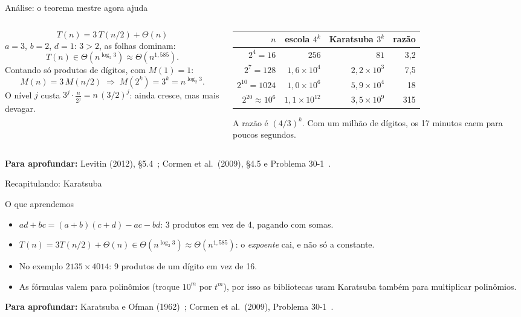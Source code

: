 \documentclass[aspectratio=169,xcolor=table]{beamer}
\newcommand{\fonte}[1]{%
  \vfill
  {\tiny\color{gray!55!black}\textbf{Para aprofundar:} #1\par}%
}
\begin{document}
\begin{frame}{Análise: o teorema mestre agora ajuda}
  \begin{columns}[T]
    \begin{column}{0.46\textwidth}
      \scriptsize
      \[ T(n) = 3\,T(n/2) + \Theta(n) \]
      $a=3$, $b=2$, $d=1$: $3 > 2$, as folhas dominam:
      \[ T(n)\in\Theta(n^{\log_2 3}) \approx \Theta(n^{1{,}585}). \]
      Contando só produtos de dígitos, com $M(1)=1$:
      \[ M(n) = 3\,M(n/2) \;\Rightarrow\; M(2^k)=3^k = n^{\log_2 3}. \]
      O nível $j$ custa $3^j\cdot\frac{n}{2^j}=n\,(3/2)^j$: ainda cresce, mas mais devagar.
    \end{column}
    \begin{column}{0.5\textwidth}
      \centering\scriptsize
      \begin{tabular}{rrrr}
        \toprule
        $n$ & escola $4^k$ & Karatsuba $3^k$ & razão \\
        \midrule
        $2^4=16$       & $256$                & $81$                 & 3,2 \\
        $2^{7}=128$    & $1{,}6\times10^{4}$  & $2{,}2\times10^{3}$  & 7,5 \\
        $2^{10}=1024$  & $1{,}0\times10^{6}$  & $5{,}9\times10^{4}$  & 18 \\
        $2^{20}\approx10^6$ & $1{,}1\times10^{12}$ & $3{,}5\times10^{9}$  & 315 \\
        \bottomrule
      \end{tabular}
      \medskip

      A razão é $(4/3)^k$. Com um milhão de dígitos, os 17 minutos caem para
      poucos segundos.
    \end{column}
  \end{columns}
  \fonte{Levitin (2012), \S 5.4~\cite{levitin2012introduction};
    Cormen et al.\ (2009), \S 4.5 e Problema 30-1~\cite{cormen2009introduction}.}
\end{frame}

\begin{frame}{Recapitulando: Karatsuba}
  \begin{block}{O que aprendemos}
    \begin{itemize}\scriptsize
      \item $ad+bc=(a+b)(c+d)-ac-bd$: 3 produtos em vez de 4, pagando com somas.
      \item $T(n)=3T(n/2)+\Theta(n)\in\Theta(n^{\log_2 3})\approx\Theta(n^{1{,}585})$: o
            \emph{expoente} cai, e não só a constante.
      \item No exemplo $2135\times4014$: 9 produtos de um dígito em vez de 16.
      \item As fórmulas valem para polinômios (troque $10^m$ por $t^m$), por isso as
            bibliotecas usam Karatsuba também para multiplicar polinômios.
    \end{itemize}
  \end{block}
  \fonte{Karatsuba e Ofman (1962)~\cite{karatsuba1963multiplication};
    Cormen et al.\ (2009), Problema 30-1~\cite{cormen2009introduction}.}
\end{frame}
\end{document}
